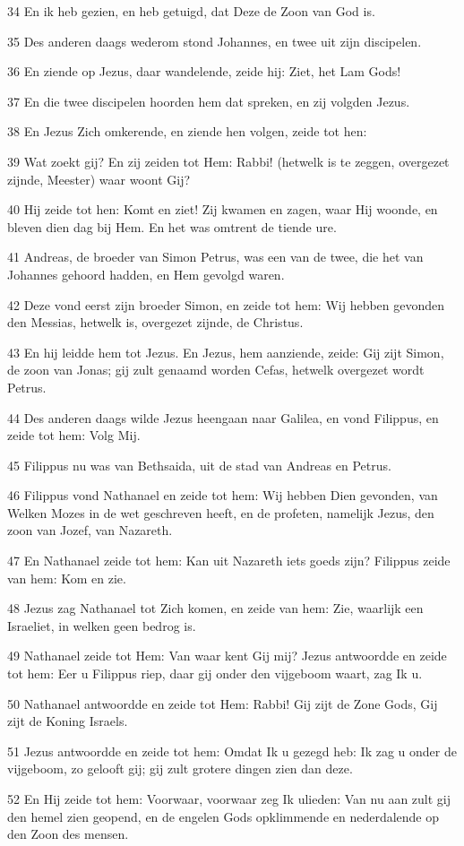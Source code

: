\par 34 En ik heb gezien, en heb getuigd, dat Deze de Zoon van God is.
\par 35 Des anderen daags wederom stond Johannes, en twee uit zijn discipelen.
\par 36 En ziende op Jezus, daar wandelende, zeide hij: Ziet, het Lam Gods!
\par 37 En die twee discipelen hoorden hem dat spreken, en zij volgden Jezus.
\par 38 En Jezus Zich omkerende, en ziende hen volgen, zeide tot hen:
\par 39 Wat zoekt gij? En zij zeiden tot Hem: Rabbi! (hetwelk is te zeggen, overgezet zijnde, Meester) waar woont Gij?
\par 40 Hij zeide tot hen: Komt en ziet! Zij kwamen en zagen, waar Hij woonde, en bleven dien dag bij Hem. En het was omtrent de tiende ure.
\par 41 Andreas, de broeder van Simon Petrus, was een van de twee, die het van Johannes gehoord hadden, en Hem gevolgd waren.
\par 42 Deze vond eerst zijn broeder Simon, en zeide tot hem: Wij hebben gevonden den Messias, hetwelk is, overgezet zijnde, de Christus.
\par 43 En hij leidde hem tot Jezus. En Jezus, hem aanziende, zeide: Gij zijt Simon, de zoon van Jonas; gij zult genaamd worden Cefas, hetwelk overgezet wordt Petrus.
\par 44 Des anderen daags wilde Jezus heengaan naar Galilea, en vond Filippus, en zeide tot hem: Volg Mij.
\par 45 Filippus nu was van Bethsaida, uit de stad van Andreas en Petrus.
\par 46 Filippus vond Nathanael en zeide tot hem: Wij hebben Dien gevonden, van Welken Mozes in de wet geschreven heeft, en de profeten, namelijk Jezus, den zoon van Jozef, van Nazareth.
\par 47 En Nathanael zeide tot hem: Kan uit Nazareth iets goeds zijn? Filippus zeide van hem: Kom en zie.
\par 48 Jezus zag Nathanael tot Zich komen, en zeide van hem: Zie, waarlijk een Israeliet, in welken geen bedrog is.
\par 49 Nathanael zeide tot Hem: Van waar kent Gij mij? Jezus antwoordde en zeide tot hem: Eer u Filippus riep, daar gij onder den vijgeboom waart, zag Ik u.
\par 50 Nathanael antwoordde en zeide tot Hem: Rabbi! Gij zijt de Zone Gods, Gij zijt de Koning Israels.
\par 51 Jezus antwoordde en zeide tot hem: Omdat Ik u gezegd heb: Ik zag u onder de vijgeboom, zo gelooft gij; gij zult grotere dingen zien dan deze.
\par 52 En Hij zeide tot hem: Voorwaar, voorwaar zeg Ik ulieden: Van nu aan zult gij den hemel zien geopend, en de engelen Gods opklimmende en nederdalende op den Zoon des mensen.

